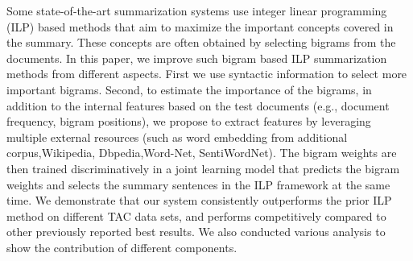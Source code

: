 Some state-of-the-art summarization systems use integer linear programming (ILP) based methods that aim to maximize the important concepts covered in the summary. These concepts are often obtained by selecting bigrams from the documents. In this paper, we improve such bigram based ILP summarization methods from different aspects. First we use syntactic information to select more important bigrams. Second, to estimate the importance of the bigrams, in addition to the internal features based on the test documents (e.g., document frequency, bigram positions), we propose to extract features by leveraging multiple external resources (such as word embedding from additional corpus,Wikipedia, Dbpedia,Word-Net, SentiWordNet). The bigram weights are then trained discriminatively in a joint learning model that predicts the bigram weights and selects the summary sentences in the ILP framework at the same time. We demonstrate that our system consistently outperforms the prior ILP method on different TAC data sets, and performs competitively compared to other previously reported best results. We also conducted various analysis to show the contribution of different components.
